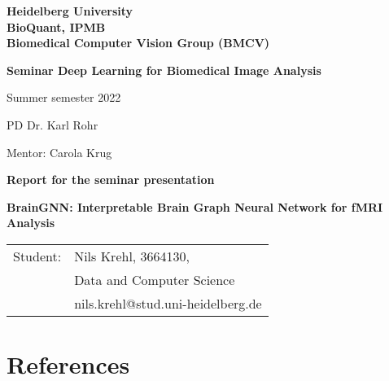 \documentclass[
     12pt,         %
     a4paper,      %
     BCOR10mm,     %
     DIV14,        %
     ]{article}
\theoremstyle{defi}
\begin{document}
\begin{titlepage}

\vspace*{1cm}
\begin{center}
\textbf{ 
\Large Heidelberg University\\
\smallskip
\Large BioQuant, IPMB\\
\smallskip
\Large Biomedical Computer Vision Group (BMCV) \\
\smallskip
}

\vspace{3cm}

\textbf{\large Seminar Deep Learning for Biomedical Image Analysis}

Summer semester 2022

PD Dr. Karl Rohr

\vspace{1cm}
Mentor: Carola Krug



\vspace{3cm}

\textbf{\large Report for the seminar presentation}

\vspace{0.5\baselineskip}
{\LARGE\textbf{BrainGNN: Interpretable Brain Graph Neural Network for fMRI Analysis \cite{LI2021102233}}
}
\vspace{0.5cm}



\end{center}

\vfill 

{\large
\begin{tabular}[l]{ll}
Student: & Nils Krehl, 3664130,\\
  & Data and Computer Science\\
  & nils.krehl@stud.uni-heidelberg.de\\
  
\end{tabular}
}

\end{titlepage}


%

\newpage
\tableofcontents
\newpage









%


\section{References}
\printbibliography[heading=none]
\end{document}
